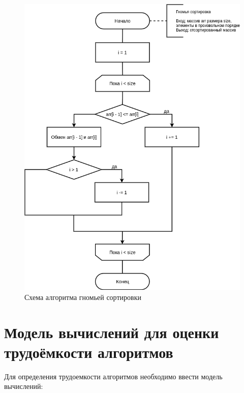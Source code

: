 \newpage

\begin{figure}[H]
	\begin{center}
		\includegraphics[scale=0.5]{img/gnome_sort.png}
	\end{center}
	\captionsetup{justification=centering}
	\caption{Схема алгоритма гномьей сортировки}
	\label{img:gnome_sort}
\end{figure}

\section{Модель вычислений для оценки трудоёмкости алгоритмов}

Для определения трудоемкости алгоритмов необходимо ввести модель вычислений:

